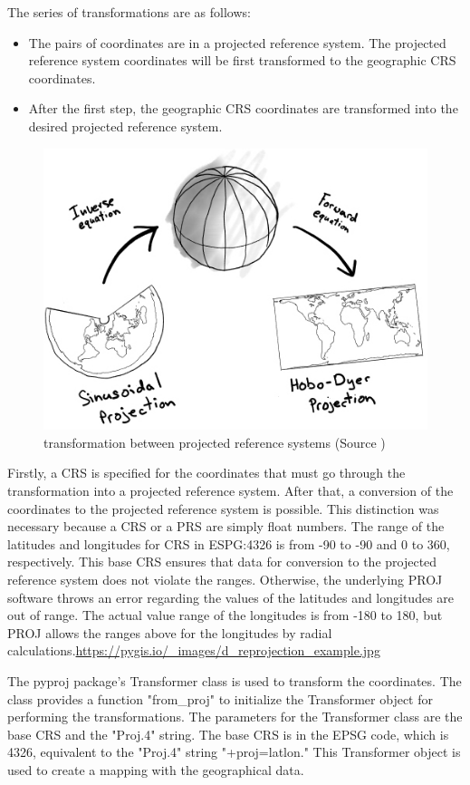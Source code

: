 The series of transformations are as follows:
\begin{itemize}
    \item The pairs of coordinates are in a projected reference system. The projected reference system coordinates will be first transformed to the geographic CRS coordinates.
    \item After the first step, the geographic CRS coordinates are transformed into the desired projected reference system.
\end{itemize}
\begin{figure}[h]
    \centering
    \includegraphics[width=0.5\linewidth]{figures/chapter-7/d_reprojection_example.jpg}
    \caption{transformation between projected reference systems (Source \cite{PROJ_IMAGES})}
    \label{fig:transformation-between-projected-reference-systems}
\end{figure}



Firstly, a CRS is specified for the coordinates that must go through the transformation into a projected reference system. After that, a conversion of the coordinates to the projected reference system is possible. This distinction was necessary because a CRS or a PRS are simply float numbers. The range of the latitudes and longitudes for CRS in ESPG:4326 is from -90 to -90 and 0 to 360, respectively. This base CRS ensures that data for conversion to the projected reference system does not violate the ranges. Otherwise, the underlying PROJ software throws an error regarding the values of the latitudes and longitudes are out of range. The actual value range of the longitudes is from -180 to 180, but PROJ allows the ranges above for the longitudes by radial calculations.\url{https://pygis.io/_images/d_reprojection_example.jpg}

The pyproj package's Transformer class is used to transform the coordinates. The class provides a function "from\_proj" to initialize the Transformer object for performing the transformations. The parameters for the Transformer class are the base CRS and the "Proj.4" string. The base CRS is in the EPSG code, which is 4326, equivalent to the "Proj.4" string "+proj=latlon." This Transformer object is used to create a mapping with the geographical data.

